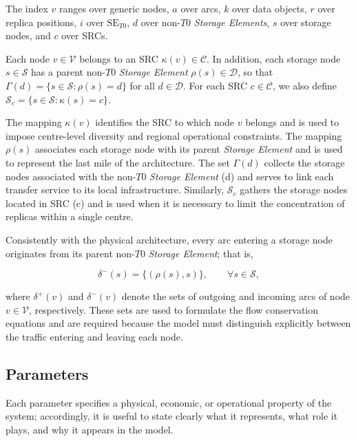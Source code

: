 \documentclass[a4paper,fleqn]{cas-dc}
\newcommand{\V}{\mathcal{V}}
\newcommand{\Dset}{\mathcal{D}}
\newcommand{\Sset}{\mathcal{S}}
\newcommand{\Cset}{\mathcal{C}}
\begin{document}
The index \(v\) ranges over generic nodes, \(a\) over arcs, \(k\) over data objects, \(r\) over replica positions, \(i\) over \(\mathrm{SE}_{T0}\), \(d\) over non-\(T0\) \emph{Storage Elements}, \(s\) over storage nodes, and \(c\) over SRCs. 

Each node \(v\in\V\) belongs to an SRC \(\kappa(v)\in\Cset\). In addition, each storage node \(s\in\Sset\) has a parent non-\(T0\) \emph{Storage Element} \(\rho(s)\in\Dset\), so that \(\Gamma(d)=\{s\in\Sset: \rho(s)=d\}\) for all \(d\in\Dset\). For each SRC \(c\in\Cset\), we also define \(\Sset_c=\{s\in\Sset:\kappa(s)=c\}\).

The mapping \(\kappa(v)\) identifies the SRC to which node \(v\) belongs and is used to impose centre-level diversity and regional operational constraints. The mapping \(\rho(s)\) associates each storage node with its parent \emph{Storage Element} and is used to represent the last mile of the architecture. The set \(\Gamma(d)\) collects the storage nodes associated with the non-\(T0\) \emph{Storage Element} (d) and serves to link each transfer service to its local infrastructure. Similarly, \(\Sset_c\) gathers the storage nodes located in SRC (c) and is used when it is necessary to limit the concentration of replicas within a single centre.


Consistently with the physical architecture, every arc entering a storage node originates from its parent non-\(T0\) \emph{Storage Element}; that is,

\begin{equation}
\nonumber \delta^{-}(s)=\{(\rho(s),s)\},
\qquad \forall s\in\Sset,
\end{equation}

where \(\delta^{+}(v)\) and \(\delta^{-}(v)\) denote the sets of outgoing and incoming arcs of node \(v\in\V\), respectively. These sets are used to formulate the flow conservation equations and are required because the model must distinguish explicitly between the traffic entering and leaving each node.



\subsection{Parameters}


Each parameter specifies a physical, economic, or operational property of the system; accordingly, it is useful to state clearly what it represents, what role it plays, and why it appears in the model.
\end{document}
